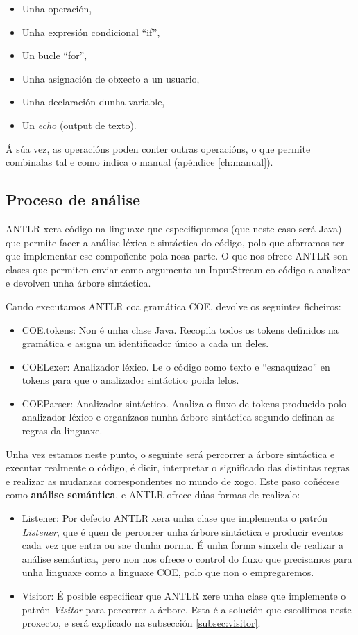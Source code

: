 \begin{itemize}
  \item Unha operación,
  \item Unha expresión condicional ``if'',
  \item Un bucle ``for'',
  \item Unha asignación de obxecto a un usuario,
  \item Unha declaración dunha variable,
  \item Un \textit{echo} (output de texto).
\end{itemize}
\par
Á súa vez, as operacións poden conter outras operacións, o que permite
combinalas tal e como indica o manual (apéndice \ref{ch:manual}).

\subsection{Proceso de análise}
ANTLR xera código na linguaxe que especifiquemos (que neste caso será Java) que
permite facer a análise léxica e sintáctica do código, polo que aforramos ter
que implementar ese compoñente pola nosa parte. O que nos ofrece ANTLR son
clases que permiten enviar como argumento un InputStream co código a analizar e
devolven unha árbore sintáctica.
\par
Cando executamos ANTLR coa gramática COE, devolve os seguintes ficheiros:
\begin{itemize}
  \item COE.tokens: Non é unha clase Java. Recopila todos os tokens definidos
  na gramática e asigna un identificador único a cada un deles.
  \item COELexer: Analizador léxico. Le o código como texto e ``esnaquízao'' en
  tokens para que o analizador sintáctico poida lelos.
  \item COEParser: Analizador sintáctico. Analiza o fluxo de tokens producido
  polo analizador léxico e organízaos nunha árbore sintáctica segundo definan as
  regras da linguaxe.
\end{itemize}
\par
Unha vez estamos neste punto, o seguinte será percorrer a árbore sintáctica e
executar realmente o código, é dicir, interpretar o significado das distintas
regras e realizar as mudanzas correspondentes no mundo de xogo. Este paso
coñécese como \textbf{análise semántica}, e ANTLR ofrece dúas formas de
realizalo:
\begin{itemize}
  \item Listener: Por defecto ANTLR xera unha clase que implementa o patrón
  \textit{Listener}, que é quen de percorrer unha árbore sintáctica e producir
  eventos cada vez que entra ou sae dunha norma. É unha forma sinxela de
  realizar a análise semántica, pero non nos ofrece o control do fluxo que
  precisamos para unha linguaxe como a linguaxe COE, polo que non o
  empregaremos.
  \item Visitor: É posible especificar que ANTLR xere unha clase que implemente
  o patrón \textit{Visitor} para percorrer a árbore. Esta é a solución que
  escollimos neste proxecto, e será explicado na subsección
  \ref{subsec:visitor}.
\end{itemize}

